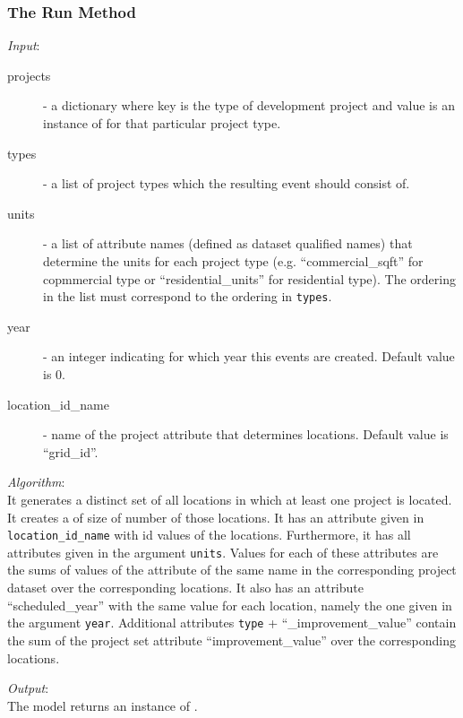 %
\subsubsection{The Run Method}
%
{\it Input}:
\begin{description}
\item[projects] - a dictionary where key is the type of development
  project and value is an instance of  for that
  particular project type.
\item[types] - a list of project types which the resulting event should
  consist of.
\item[units] - a list of attribute \attributesindex names (defined as dataset \datasetindex qualified names)
  that determine the units for each project type (e.g. ``commercial_sqft'' for
  copmmercial type or ``residential_units'' for residential type). The
  ordering in the list must correspond to the ordering in \verb|types|.
\item[year] - an integer indicating for which year this events are
  created. Default value is 0.
\item[location_id_name] - name of the project attribute \attributesindex that determines
  locations. Default value is ``grid_id''.
\end{description}

{\it Algorithm}:\\[1mm]
It generates a distinct set of all locations in which at least one project is
located. It creates a  of size of number of those
locations. It has an attribute \attributesindex given in \verb|location_id_name| with id values
of the locations. Furthermore, it has all attributes \attributesindex given in the argument
\verb|units|. Values for each of these attributes \attributesindex are the sums of values of the
attribute \attributesindex of the same name in the corresponding project dataset \datasetindex over the
corresponding locations. It also has an attribute \attributesindex ``scheduled_year'' with the
same value for each location, namely the one given in the argument
\verb|year|. Additional attributes \attributesindex \verb|type| + ``_improvement_value''
contain the sum of the project set attribute \attributesindex ``improvement_value'' over the
corresponding locations.

{\it Output}:~\\[1mm]
The model \modelsindex returns an instance of .

